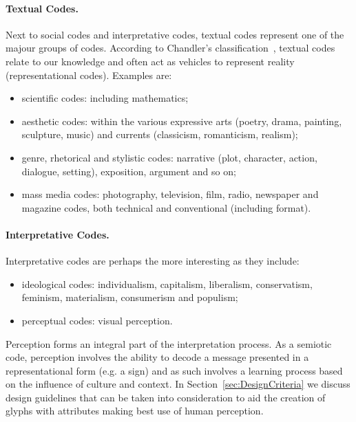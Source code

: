 \paragraph{Textual Codes.} 
Next to social codes and interpretative codes, textual codes  represent one of the majour groups of codes. According to Chandler's classification~\cite{Chandler2002}, textual codes relate to our knowledge and often act as vehicles to represent reality (representational codes). Examples are:
\begin{itemize}
\item scientific codes: including mathematics;
\item aesthetic codes: within the various expressive arts (poetry, drama, painting, sculpture, music) and currents (classicism, romanticism, realism);
\item genre, rhetorical and stylistic codes: narrative (plot, character, action, dialogue, setting), exposition, argument and so on;
\item mass media codes: photography, television, film, radio, newspaper and magazine codes, both technical and conventional (including format). 
\end{itemize}

\paragraph{Interpretative Codes.}
Interpretative codes are perhaps the more interesting as they include:
\begin{itemize} 
\item ideological codes: individualism, capitalism, liberalism, conservatism, feminism, materialism, consumerism and populism;
\item perceptual codes: visual perception.
\end{itemize} 
Perception forms an integral part of the interpretation process. As a semiotic code, perception involves the ability to decode a message presented in a representational form (e.g. a sign) and as such involves a learning process based on the influence of culture and context. In Section~\ref{sec:DesignCriteria} we discuss design guidelines that can be taken into consideration to aid the creation of glyphs with attributes making best use of human perception.


